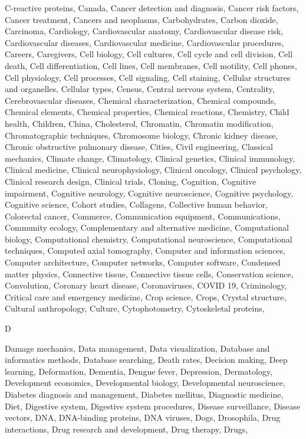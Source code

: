 C-reactive proteins, Canada, Cancer detection and diagnosis, Cancer risk factors, Cancer treatment, Cancers and neoplasms, Carbohydrates, Carbon dioxide, Carcinoma, Cardiology, Cardiovascular anatomy, Cardiovascular disease risk, Cardiovascular diseases, Cardiovascular medicine, Cardiovascular procedures, Careers, Caregivers, Cell biology, Cell cultures, Cell cycle and cell division, Cell death, Cell differentiation, Cell lines, Cell membranes, Cell motility, Cell phones, Cell physiology, Cell processes, Cell signaling, Cell staining, Cellular structures and organelles, Cellular types, Census, Central nervous system, Centrality, Cerebrovascular diseases, Chemical characterization, Chemical compounds, Chemical elements, Chemical properties, Chemical reactions, Chemistry, Child health, Children, China, Cholesterol, Chromatin, Chromatin modification, Chromatographic techniques, Chromosome biology, Chronic kidney disease, Chronic obstructive pulmonary disease, Cities, Civil engineering, Classical mechanics, Climate change, Climatology, Clinical genetics, Clinical immunology, Clinical medicine, Clinical neurophysiology, Clinical oncology, Clinical psychology, Clinical research design, Clinical trials, Cloning, Cognition, Cognitive impairment, Cognitive neurology, Cognitive neuroscience, Cognitive psychology, Cognitive science, Cohort studies, Collagens, Collective human behavior, Colorectal cancer, Commerce, Communication equipment, Communications, Community ecology, Complementary and alternative medicine, Computational biology, Computational chemistry, Computational neuroscience, Computational techniques, Computed axial tomography, Computer and information sciences, Computer architecture, Computer networks, Computer software, Condensed matter physics, Connective tissue, Connective tissue cells, Conservation science, Convolution, Coronary heart disease, Coronaviruses, COVID 19, Criminology, Critical care and emergency medicine, Crop science, Crops, Crystal structure, Cultural anthropology, Culture, Cytophotometry, Cytoskeletal proteins, 

D

Damage mechanics, Data management, Data visualization, Database and informatics methods, Database searching, Death rates, Decision making, Deep learning, Deformation, Dementia, Dengue fever, Depression, Dermatology, Development economics, Developmental biology, Developmental neuroscience, Diabetes diagnosis and management, Diabetes mellitus, Diagnostic medicine, Diet, Digestive system, Digestive system procedures, Disease surveillance, Disease vectors, DNA, DNA-binding proteins, DNA viruses, Dogs, Drosophila, Drug interactions, Drug research and development, Drug therapy, Drugs, 

